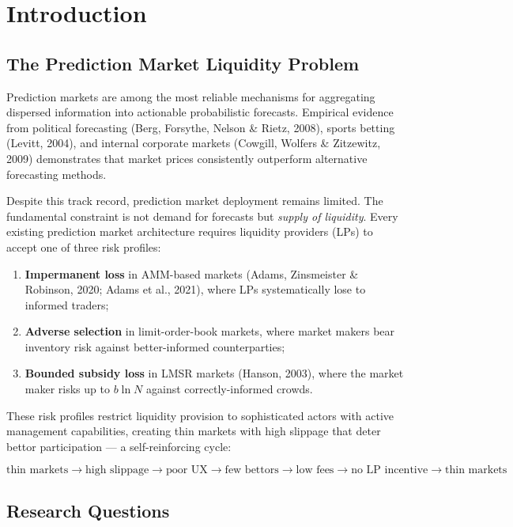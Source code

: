 \documentclass{ledger}
\theoremstyle{plain}
\theoremstyle{remark}
\begin{document}
\section{Introduction}\label{sec:intro}

\subsection{The Prediction Market Liquidity Problem}

Prediction markets are among the most reliable mechanisms for aggregating
dispersed information into actionable probabilistic forecasts. Empirical
evidence from political forecasting (Berg, Forsythe, Nelson \& Rietz, 2008),
sports betting (Levitt, 2004), and internal corporate markets (Cowgill, Wolfers
\& Zitzewitz, 2009) demonstrates that market prices consistently outperform
alternative forecasting methods.

Despite this track record, prediction market deployment remains limited. The
fundamental constraint is not demand for forecasts but \emph{supply of
liquidity}. Every existing prediction market architecture requires liquidity
providers (LPs) to accept one of three risk profiles:

\begin{enumerate}
  \item \textbf{Impermanent loss} in AMM-based markets (Adams, Zinsmeister \&
  Robinson, 2020; Adams et al., 2021), where LPs systematically lose to informed
  traders;
  \item \textbf{Adverse selection} in limit-order-book markets, where market
  makers bear inventory risk against better-informed counterparties;
  \item \textbf{Bounded subsidy loss} in LMSR markets (Hanson, 2003), where the
  market maker risks up to $b \ln N$ against correctly-informed crowds.
\end{enumerate}

These risk profiles restrict liquidity provision to sophisticated actors with
active management capabilities, creating thin markets with high slippage that
deter bettor participation --- a self-reinforcing cycle:

\[
\text{thin markets} \rightarrow \text{high slippage} \rightarrow \text{poor UX}
\rightarrow \text{few bettors} \rightarrow \text{low fees} \rightarrow
\text{no LP incentive} \rightarrow \text{thin markets}
\]

\subsection{Research Questions}
\end{document}
